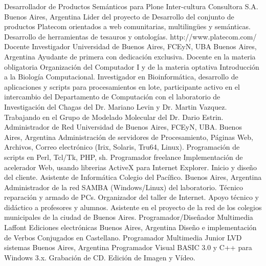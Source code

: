 	{Desarrollador de Productos Semánticos para Plone}
	{Inter-cultura Consultora S.A.}
	{Buenos Aires, Argentina}
	{}
	{Lider del proyecto de Desarrollo del conjunto de productos Platecom
	orientados a web comunitarias, multilingües y semánticas. Desarrollo
	de herramientas de tesauros y ontologías. http://www.platecom.com/}
	{Docente Investigador}
	{Universidad de Buenos Aires, FCEyN, UBA}
	{Buenos Aires, Argentina}
	{}
	{Ayudante de primera con dedicación exclusiva.
	Docente en la materia obligatoria Organización del Computador I y de la
	materia optativa Introducción a la Biología Computacional.
	Investigador en Bioinformática, desarrollo de aplicaciones y scripts para
	procesamientos en lote, participante activo en el intercambio del Departamento
	de Computación con el laboratorio de Investigación del Chagas del
	Dr. Mariano Levin y Dr. Martin Vazquez. Trabajando en el Grupo de Modelado Molecular
	del Dr. Dario Estrin.}
	{Administrador de Red}
	{Universidad de Buenos Aires, FCEyN, UBA.}
	{Buenos Aires, Argentina}
	{}
	{Administración de servidores de Procesamiento, Páginas Web,
	Archivos, Correo electrónico (Irix, Solaris, Tru64, Linux).
	Programación de scripts en Perl, Tcl/Tk, PHP, sh.}
	{Programador freelance}
	{}
	{}
	{}
	{Implementación de acelerador Web, usando librerias ActiveX para Internet Explorer. Inicio y diseño del cliente.}
	{Asistente de Informática}
	{Colegio del Pacífico.}
	{Buenos Aires, Argentina}
	{}
	{Administrador de la red SAMBA (Windows/Linux) del
	laboratorio. Técnico reparación y armado de PCs. Organizador del taller de
	Internet. Apoyo técnico y didáctico a profesores y alumnos. Asistente en el
	proyecto de la red de los colegios municipales de la ciudad de Buenos Aires.}
	{Programador/Diseñador Multimedia}
	{Laffont Ediciones electrónicas}
	{Buenos Aires, Argentina}
	{}
	{Diseño e implementación de Verbos Conjugados en Castellano.}
	{Programador Multimedia Junior}
	{LVD sistemas}
	{Buenos Aires, Argentina}
	{}
	{Programador Visual BASIC 3.0 y C++ para Windows 3.x. Grabación de CD. Edición de Imagen y Vídeo.}


